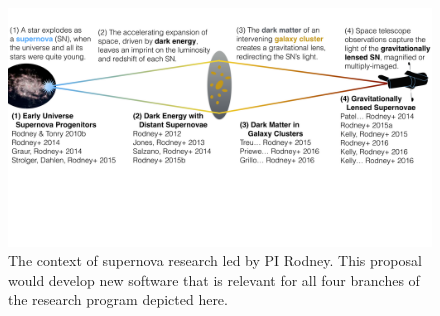 \begin{figure}[b!]
\includegraphics[width=\textwidth]{sloan_fellowship_fig.pdf}
\caption{
The context of supernova research led by PI Rodney.  This proposal
would develop new software that is relevant for all four branches of
the research program depicted here.}
\end{figure}

